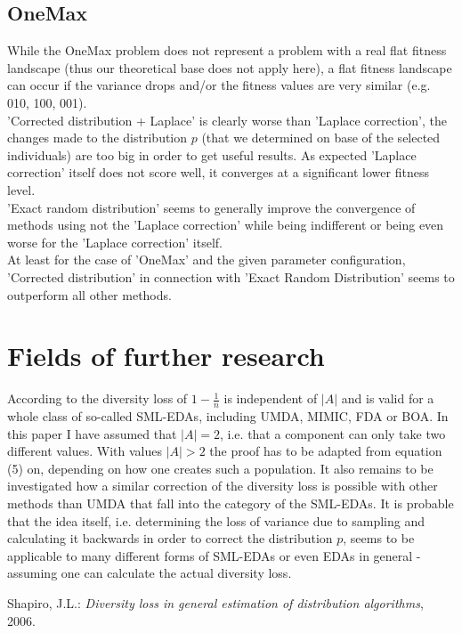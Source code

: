 \documentclass[a4paper,twoside]{report}
\begin{document}
\subsection{OneMax}

While the OneMax problem does not represent a problem with a real flat fitness landscape (thus our theoretical base does not apply here), a flat fitness landscape can occur if the variance drops and/or the fitness values are very similar (e.g. 010, 100, 001).\\
'Corrected distribution + Laplace' is clearly worse than 'Laplace correction', the changes made to the distribution \(p\) (that we determined on base of the selected individuals) are too big in order to get useful results. As expected 'Laplace correction' itself does not score well, it converges at a significant lower fitness level.\\
'Exact random distribution' seems to generally improve the convergence of methods using not the 'Laplace correction' while being indifferent or being even worse for the 'Laplace correction' itself.\\
At least for the case of 'OneMax' and the given parameter configuration, 'Corrected distribution' in connection with 'Exact Random Distribution' seems to outperform all other methods.

\section{Fields of further research}

According to \cite{Shapiro} the diversity loss of \(1 - \frac{1}{n}\) is independent of \(|A|\) and is valid for a whole class of so-called SML-EDAs, including UMDA, MIMIC, FDA or BOA. In this paper I have assumed that \(|A| = 2\), i.e. that a component can only take two different values. With values \(|A| > 2\) the proof has to be adapted from equation (5) on, depending on how one creates such a population. It also remains to be investigated how a similar correction of the diversity loss is possible with other methods than UMDA that fall into the category of the SML-EDAs. It is probable that the idea itself, i.e. determining the loss of variance due to sampling and calculating it backwards in order to correct the distribution \(p\), seems to be applicable to many different forms of SML-EDAs or even EDAs in general - assuming one can calculate the actual diversity loss.

\begin{thebibliography}{99}
 {\sc Shapiro, J.L.:}  \textit{Diversity loss in general estimation of distribution algorithms}, 2006.
\end{thebibliography}
\end{document}
